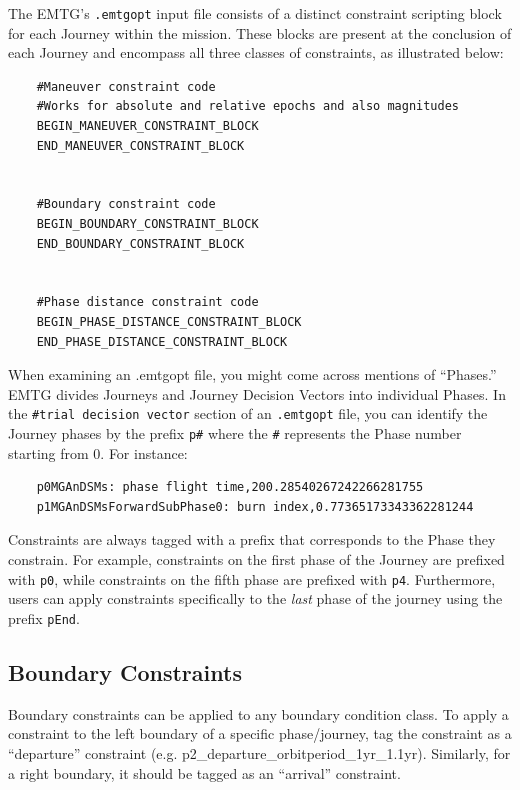 \documentclass[11pt]{article}
\begin{document}
The \ac{EMTG}'s \verb|.emtgopt| input file consists of a distinct constraint scripting block for each Journey within the mission. These blocks are present at the conclusion of each Journey and encompass all three classes of constraints, as illustrated below:

\begin{verbatim}
    #Maneuver constraint code
    #Works for absolute and relative epochs and also magnitudes
    BEGIN_MANEUVER_CONSTRAINT_BLOCK
    END_MANEUVER_CONSTRAINT_BLOCK
    
    
    #Boundary constraint code
    BEGIN_BOUNDARY_CONSTRAINT_BLOCK
    END_BOUNDARY_CONSTRAINT_BLOCK
    
    
    #Phase distance constraint code
    BEGIN_PHASE_DISTANCE_CONSTRAINT_BLOCK
    END_PHASE_DISTANCE_CONSTRAINT_BLOCK
\end{verbatim}

\noindent When examining an .emtgopt file, you might come across mentions of ``Phases.'' \ac{EMTG} divides Journeys and Journey Decision Vectors into individual Phases. In the \verb|#trial decision vector| section of an \verb|.emtgopt| file, you can identify the Journey phases by the prefix \texttt{p\#} where the \verb|#| represents the Phase number starting from 0. For instance:

\begin{verbatim}
    p0MGAnDSMs: phase flight time,200.28540267242266281755
    p1MGAnDSMsForwardSubPhase0: burn index,0.77365173343362281244
\end{verbatim}


\noindent Constraints are always tagged with a prefix that corresponds to the Phase they constrain. For example, constraints on the first phase of the Journey are prefixed with \texttt{p0}, while constraints on the fifth phase are prefixed with \texttt{p4}. Furthermore, users can apply constraints specifically to the \textit{last} phase of the journey using the prefix \texttt{pEnd}.

\subsection{Boundary Constraints}
\label{sec:boundary_constraints}

\noindent Boundary constraints can be applied to any boundary condition class. To apply a constraint to the left boundary of a specific phase/journey, tag the constraint as a ``departure'' constraint (e.g. p2\_departure\_orbitperiod\_1yr\_1.1yr). Similarly, for a right boundary, it should be tagged as an ``arrival'' constraint.
\end{document}

